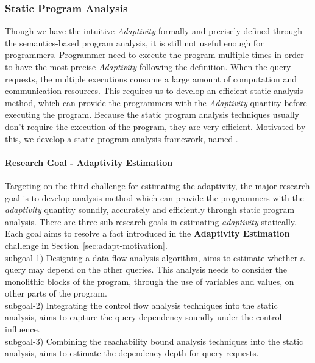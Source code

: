 \subsubsection{Static Program Analysis}
\label{sec:adapt-intro-static}
%
Though we have the intuitive \emph{Adaptivity} formally and precisely defined through the semantics-based program analysis,
it is still not useful enough for programmers.
Programmer need to execute the program multiple times in order to have the most precise \emph{Adaptivity} following the definition.
When the query requests, the multiple executions consume a large amount of computation and communication resources.
This requires us to develop an efficient static analysis method, 
which can provide the programmers with the \emph{Adaptivity} quantity before executing the program.
Because the static program analysis techniques usually don't require the execution of the program,
they are very efficient.
Motivated by this, we develop a static program analysis framework, named {\THESYSTEM}.

\paragraph{Research Goal - Adaptivity Estimation}
Targeting on the third challenge
for estimating the adaptivity, 
the major research goal is to develop analysis method which can
provide the programmers with the \emph{adaptivity} quantity
soundly, accurately and
efficiently
through static program analysis.
There are three sub-research goals in estimating \emph{adaptivity} statically.
Each goal aims to resolve a fact introduced in the \textbf{Adaptivity Estimation} challenge in Section~\ref{sec:adapt-motivation}.
\\
subgoal-1) Designing a data flow analysis algorithm, aims to estimate whether a query may depend on the other queries. 
This analysis needs to consider the monolithic blocks of the program, through the use of variables and values, on other parts of the program.
\\
subgoal-2) Integrating the control flow analysis techniques into the static analysis,
 aims to 
capture the query dependency soundly
under the control influence.
 \\
subgoal-3) Combining the reachability bound analysis techniques into the static analysis,
aims to estimate
the dependency depth for query requests.
